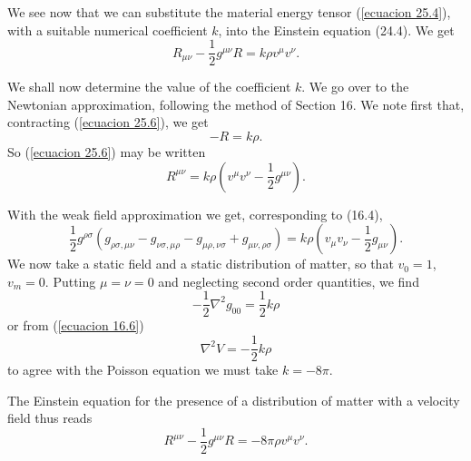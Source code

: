 We see now that we can substitute the material energy tensor (\ref{ecuacion 25.4}), with a suitable numerical 
coefficient $k$, into the Einstein equation (24.4). We get
\begin{equation}
 \label{ecuacion 25.6}
 R_{\mu\nu} - \frac{1}{2} g^{\mu\nu} R = k \rho v^\mu v^\nu.
\end{equation}

We shall now determine the value of the coefficient $k$. We go over to the Newtonian approximation, following the 
method of Section 16. We note first that, contracting (\ref{ecuacion 25.6}), we get
\[
 - R = k \rho .
\]
So (\ref{ecuacion 25.6}) may be written 
\[
 R^{\mu\nu} = k \rho \left( v^\mu v^\nu - \frac{1}{2} g^{\mu\nu} \right).
\]
 
With the weak field approximation we get, corresponding to (16.4),
\[
 \frac{1}{2} g^{\rho\sigma} \left(
     g_{\rho\sigma,\mu\nu} - g_{\nu\sigma,\mu\rho} - g_{\mu\rho,\nu\sigma} + g_{\mu\nu,\rho\sigma}
 \right)
 = k \rho \left(
     v_\mu v_\nu - \frac{1}{2}g_{\mu\nu}
 \right).
\]
We now take a static field and a static distribution of matter, so that $v_0 = 1$, $v_m = 0$. Putting $\mu = \nu = 0$ 
and neglecting second order quantities, we find 
\[
 -\frac{1}{2} \nabla^2 g_{00} = \frac{1}{2} k \rho
\]
or from (\ref{ecuacion 16.6})
\[
 \nabla^2 V = -\frac{1}{2} k \rho
\]
to agree with the Poisson equation we must take $k = - 8 \pi$.

The Einstein equation for the presence of a distribution of matter with a velocity field thus reads
\begin{equation}
 \label{ecuacion 25.7}
 R^{\mu\nu} - \frac{1}{2} g^{\mu\nu} R = - 8\pi \rho v^\mu v^\nu.
\end{equation}










